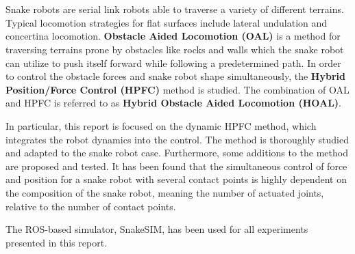 \chapter{\abstractname}


Snake robots are serial link robots able to traverse a variety of different terrains. Typical locomotion strategies for flat surfaces include lateral undulation and concertina locomotion. \textbf{Obstacle Aided Locomotion (OAL)} is a method for traversing terrains prone by obstacles like rocks and walls which the snake robot can utilize to push itself forward while following a predetermined path. In order to control the obstacle forces and snake robot shape simultaneously, the \textbf{Hybrid Position/Force Control (HPFC)} method is studied. The combination of OAL and HPFC is referred to as \textbf{Hybrid Obstacle Aided Locomotion (HOAL)}.

In particular, this report is focused on the dynamic HPFC method, which integrates the robot dynamics into the control. The method is thoroughly studied and adapted to the snake robot case. Furthermore, some additions to the method are proposed and tested. It has been found that the simultaneous control of force and position for a snake robot with several contact points is highly dependent on the composition of the snake robot, meaning the number of actuated joints, relative to the number of contact points.

The ROS-based simulator, SnakeSIM, has been used for all experiments presented in this report.


\makeatletter
{}


\makeatother







